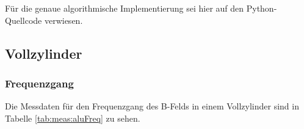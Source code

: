 F\"ur   die   genaue  algorithmische   Implementierung   sei   hier  auf   den
Python-Quellcode verwiesen. %


\clearpage
\subsection{Vollzylinder}
\label{sec:ausw:subsec:hohlz}


\subsubsection{Frequenzgang}
\label{sec:ausw:subsec:hohlz:subsubsec:steel}


Die Messdaten f\"ur den Frequenzgang des B-Felds in einem Vollzylinder sind in
Tabelle \ref{tab:meas:aluFreq} zu sehen.

